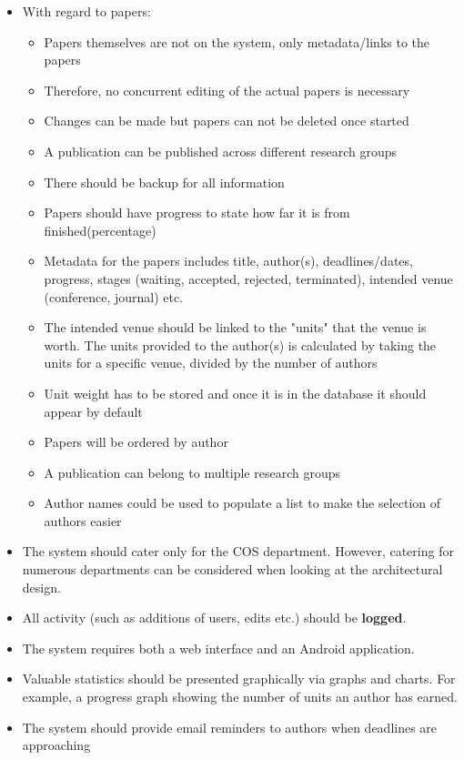 \documentclass[a4paper,12pt]{article}
\begin{document}
\begin{itemize}
\item With regard to papers:
\begin{itemize}
\item Papers themselves are not on the system, only metadata/links to the papers
\item Therefore, no concurrent editing of the actual papers is necessary
\item Changes can be made but papers can not be deleted once started
\item A publication can be published across different research groups
\item There should be backup for all information 
\item Papers should have progress to state how far it is from finished(percentage)
\item Metadata for the papers includes title, author(s), deadlines/dates, progress, stages (waiting, accepted, rejected, terminated), intended venue (conference, journal) etc.
\item The intended venue should be linked to the "units" that the venue is worth. The units provided to the author(s) is calculated by taking the units for a specific venue, divided by the number of authors
\item Unit weight has to be stored and once it is in the database it should appear by default
\item Papers will be ordered by author
\item A publication can belong to multiple research groups
\item Author names could be used to populate a list to make the selection of authors easier
\end{itemize}

\item The system should cater only for the COS department. However, catering for numerous departments can be considered when looking at the architectural design.

\item All activity (such as additions of users, edits etc.) should be \textbf{logged}.

\item The system requires both a web interface and an Android application.

\item Valuable statistics should be presented graphically via graphs and charts. For example, a progress graph showing the number of units an author has earned.

\item The system should provide email reminders to authors when deadlines are approaching

\end{itemize}
\end{document}
